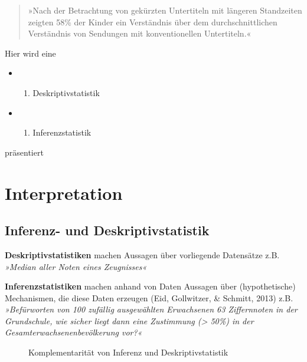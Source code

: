 \documentclass[
  letterpaper,
  DIV=11]{scrreprt}
\providecommand{\tightlist}{%
  \setlength{\itemsep}{0pt}\setlength{\parskip}{0pt}}\usepackage{longtable,booktabs,array}
\begin{document}
\begin{quote}
»Nach der Betrachtung von gekürzten Untertiteln mit längeren Standzeiten
zeigten 58\% der Kinder ein Verständnis über dem durchschnittlichen
Verständnis von Sendungen mit konventionellen Untertiteln.«
\end{quote}

Hier wird eine

\begin{itemize}
\item
  \begin{enumerate}
  \def\labelenumi{(\Alph{enumi})}
  \tightlist
  \item
    Deskriptivstatistik\\
  \end{enumerate}
\item
  \begin{enumerate}
  \def\labelenumi{(\Alph{enumi})}
  \setcounter{enumi}{1}
  \tightlist
  \item
    Inferenzstatistik
  \end{enumerate}
\end{itemize}

präsentiert

\section{Interpretation}\label{interpretation}

\subsection{Inferenz- und
Deskriptivstatistik}\label{inferenz--und-deskriptivstatistik}

\textbf{Deskriptivstatistiken} machen Aussagen über vorliegende
Datensätze z.B. \emph{»Median aller Noten eines Zeugnisses«}

\textbf{Inferenzstatistiken} machen anhand von Daten Aussagen über
(hypothetische) Mechanismen, die diese Daten erzeugen (Eid, Gollwitzer,
\& Schmitt, 2013) z.B. \emph{»Befürworten von 100 zufällig ausgewählten
Erwachsenen 63 Ziffernnoten in der Grundschule, wie sicher liegt dann
eine Zustimmung (\textgreater{} 50\%) in der
Gesamterwachsenenbevölkerung vor?«}

\begin{figure}[H]

{\centering 

}

\caption{Komplementarität von Inferenz und Deskriptivstatistik}

\end{figure}%
\end{document}
